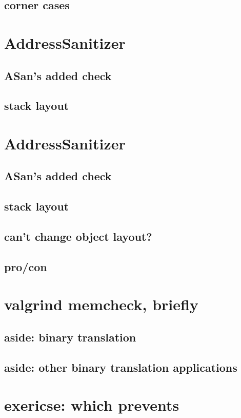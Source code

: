 \subsection{corner cases}


\section{AddressSanitizer}


\subsection{ASan's added check}


\subsection{stack layout}




\section{AddressSanitizer}


\subsection{ASan's added check}


\subsection{stack layout}


\subsection{can't change object layout?}


\subsection{pro/con}


\section{valgrind memcheck, briefly}


\subsection{aside: binary translation}


\subsection{aside: other binary translation applications}

\section{exericse: which prevents}

